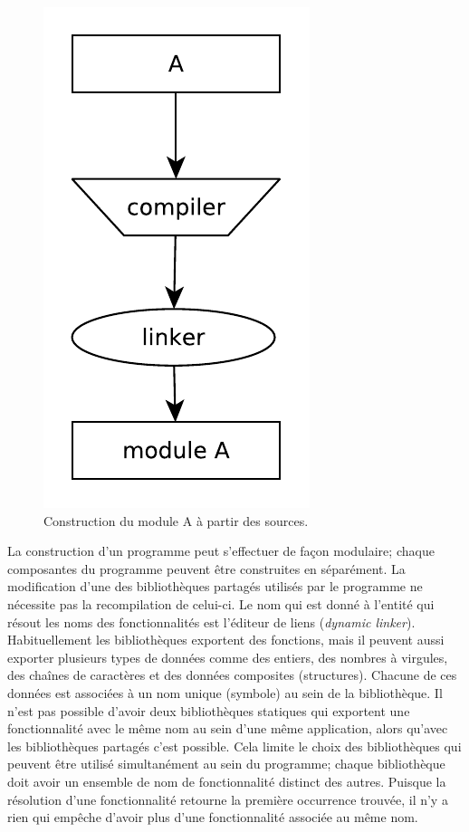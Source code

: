 \begin{figure}[ht]
  \includegraphics[width=0.20\linewidth]{figures/basic_module_compilation.pdf}
  \caption{Construction du module A à partir des sources.}
\end{figure}

%
%


La construction d'un programme peut s'effectuer de façon modulaire; chaque
composantes du programme peuvent être construites en séparément.  La
modification d'une des bibliothèques partagés utilisés par
le programme ne nécessite pas la recompilation de celui-ci. Le nom qui est
donné à l'entité qui résout les noms des fonctionnalités est l'éditeur de liens (\textit{dynamic linker}).
Habituellement les bibliothèques exportent des fonctions, mais il peuvent aussi
exporter plusieurs types de données comme des entiers, des nombres à virgules,
des chaînes de caractères et des données composites (structures). Chacune de ces données est
associées à un nom unique (symbole) au sein de la bibliothèque.
Il n'est pas possible d'avoir deux bibliothèques statiques qui exportent une
fonctionnalité avec le même nom au sein d'une même application, alors qu'avec
les bibliothèques partagés c'est possible. Cela limite le choix des
bibliothèques qui peuvent être utilisé simultanément au sein du programme;
chaque bibliothèque doit avoir un ensemble de nom de fonctionnalité distinct
des autres. Puisque la résolution d'une fonctionnalité retourne la première
occurrence trouvée, il n'y a rien qui empêche d'avoir plus d'une fonctionnalité
associée au même nom.

